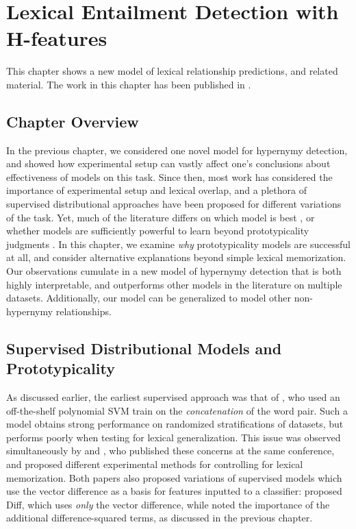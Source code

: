 \chapter{Lexical Entailment Detection with H-features}
\label{ch:hpm}

This chapter shows a new model of lexical relationship predictions, and related
material. The work in this chapter has been published in
.

\section{Chapter Overview}

In the previous chapter, we considered one novel model for hypernymy detection,
and showed how experimental setup can vastly affect one's conclusions about
effectiveness of models on this task. Since then, most work has considered the
importance of experimental setup and lexical overlap, and a plethora of
supervised distributional approaches have been proposed for different variations
of the task. Yet, much of the literature differs on which model is best
\cite{weeds:2014:coling,roller:2014:coling}, or whether models are sufficiently
powerful to learn beyond prototypicality judgments \cite{levy:2015:naacl}.
In this chapter, we examine {\em why} prototypicality models are
successful at all, and consider alternative explanations beyond simple lexical
memorization. Our observations cumulate in a new model of hypernymy detection
that is both highly interpretable, and outperforms other models in the literature
on multiple datasets. Additionally, our model can be generalized to model
other non-hypernymy relationships.

\section{Supervised Distributional Models and Prototypicality}

As discussed earlier, the earliest supervised approach was that of
, who used an off-the-shelf polynomial SVM train on
the {\em concatenation} of the word pair. Such a model obtains strong
performance on randomized stratifications of datasets, but performs poorly
when testing for lexical generalization. This issue was observed simultaneously
by  and , who published
these concerns at the same conference, and proposed different experimental
methods for controlling for lexical memorization. Both papers also proposed
variations of supervised models which use the vector difference as a basis
for features inputted to a classifier:  proposed
Diff, which uses {\em only} the vector difference, while
 noted the importance of the additional
difference-squared terms, as discussed in the previous chapter.

